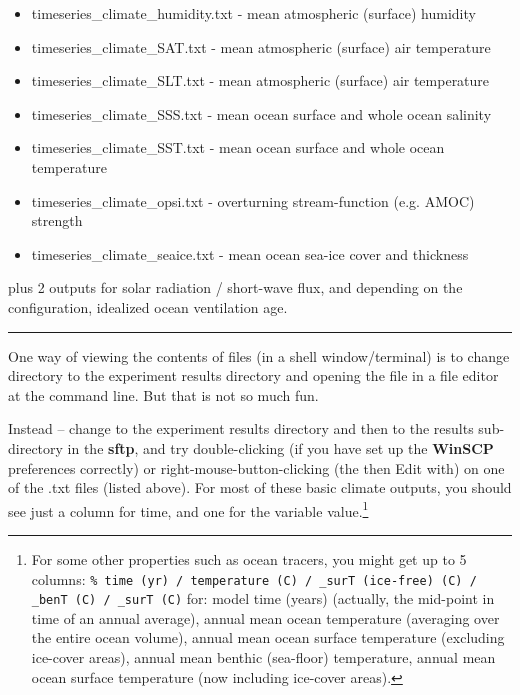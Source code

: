 \vspace{1mm}
\begin{itemize}[noitemsep]
\setlength{\itemindent}{.2in}
\item \textsf{\footnotesize timeseries\_climate\_humidity.txt} - mean atmospheric (surface) humidity
\item \textsf{\footnotesize timeseries\_climate\_SAT.txt}      - mean atmospheric (surface) air temperature
\item \textsf{\footnotesize timeseries\_climate\_SLT.txt}      - mean atmospheric (surface) air temperature
\item \textsf{\footnotesize timeseries\_climate\_SSS.txt}      - mean ocean surface and whole ocean salinity
\item \textsf{\footnotesize timeseries\_climate\_SST.txt}      - mean ocean surface and whole ocean temperature
\item \textsf{\footnotesize timeseries\_climate\_opsi.txt}     - overturning stream-function (e.g. AMOC) strength
\item \textsf{\footnotesize timeseries\_climate\_seaice.txt}   - mean ocean sea-ice cover and thickness
\end{itemize}

\noindent plus 2 outputs for solar radiation / short-wave flux, and depending on the configuration, idealized ocean ventilation age.

\vspace{1mm}\noindent\rule{4cm}{0.1mm}\vspace{2mm}

\noindent One way of viewing the contents of files (in a shell window/terminal) is to change directory to the experiment results directory and opening the file in a file editor at the command line. But that is not so much fun.

Instead – change to the experiment results directory and then to the \textsf{\footnotesize results} sub-directory in the \textbf{sftp}, and try double-clicking (if you have set up the \textbf{WinSCP} preferences correctly) or right-mouse-button-clicking (the then \textsf{\footnotesize Edit with}) on one of the .txt files (listed above). For most of these basic climate outputs, you should see just a column for time, and one for the variable value.\footnote{For some other properties such as ocean tracers, you might get up to 5 columns:
\texttt{\% time (yr) / temperature (C) / \_surT (ice-free) (C) / \_benT (C) / \_surT (C)}
for: model time (years) (actually, the mid-point in time of an annual average), annual mean ocean temperature (averaging over the entire ocean volume), annual mean ocean surface temperature (excluding ice-cover areas), annual mean benthic (sea-floor) temperature, annual mean ocean surface temperature (now including ice-cover areas).} 

